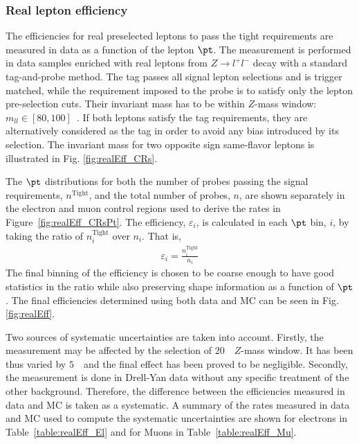 \subsubsection{Real lepton efficiency}

The efficiencies for real preselected leptons to pass the tight requirements are measured in data as a function of the lepton $\pt$. The measurement is performed in data samples enriched with real leptons from $Z\rightarrow l^+l^-$ decay with a standard tag-and-probe method. The tag passes all signal lepton selections and is trigger matched, while the requirement imposed to the probe is to satisfy only the lepton pre-selection cuts. Their invariant mass has to be within $Z$-mass window: $m_{ll}\in[80, 100]$~\GeV{}. If both leptons satisfy the tag requirements, they are alternatively considered as the tag in order to avoid any bias introduced by its selection. The invariant mass for two opposite sign same-flavor leptons is illustrated in Fig. \ref{fig:realEff_CRs}.

The $\pt$ distributions for both the number of probes passing the signal requirements, $n^{\mathrm{Tight}}$, and the total number of probes, $n$, are shown separately in the electron and muon control regions used to derive the rates in Figure~\ref{fig:realEff_CRsPt}.
The efficiency, $\varepsilon_i$, is calculated in each $\pt$ bin, $i$, by taking the ratio of $n_{i}^{\mathrm{Tight}}$ over $n_i$. That is,
\begin{align*}
\varepsilon_i=\frac{n_{i}^{\mathrm{Tight}}}{n_{i}}
\end{align*}
The final binning of the efficiency is chosen to be coarse enough
to have good statistics in the ratio while also preserving shape information as a function
of $\pt$. 
The final efficiencies determined using both data and MC 
can be seen in Fig. \ref{fig:realEff}.

Two sources of systematic uncertainties are taken into account. Firstly, the measurement may be affected by the selection of $20$~\GeV\ $Z$-mass window. It has been thus varied by $5$~\GeV\ and the final effect has been proved to be negligible. Secondly, the measurement is done in Drell-Yan data without any  specific treatment of the other background. Therefore, the difference between the efficiencies measured in data and MC is taken as a systematic.  A summary of the rates measured in
data and MC used to compute the systematic uncertainties are shown for electrons
in Table~\ref{table:realEff_El} and for Muons in Table~\ref{table:realEff_Mu}.

